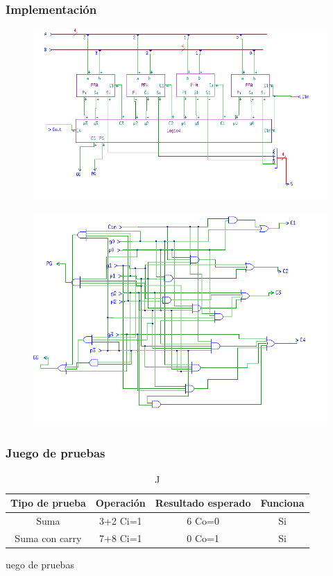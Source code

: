 \documentclass{article}
\begin{document}
		\subsubsection*{Implementación}
		 \begin{figure}[ht]
		 	\includegraphics[width=0.8\linewidth]{CLA}
		 	\centering
		 \end{figure}
		
		 \begin{figure}[ht]
		 	\includegraphics[width=0.8\linewidth]{CLALogic}
			\centering
		 \end{figure}


		\subsubsection*{Juego de pruebas}
		\begin{table}[h]
			\begin{center}
				\begin{tabular}{| c | c | c | c |}
					\hline
					Tipo de prueba & Operación & Resultado esperado & Funciona \\ \hline
				
					Suma & 3+2 Ci=1 & 6 Co=0 & Si \\ \hline
					Suma con carry & 7+8 Ci=1 & 0 Co=1 & Si \\ \hline
			
				\end{tabular}
				\caption Juego de pruebas
			\end{center}
		\end{table}
\end{document}
